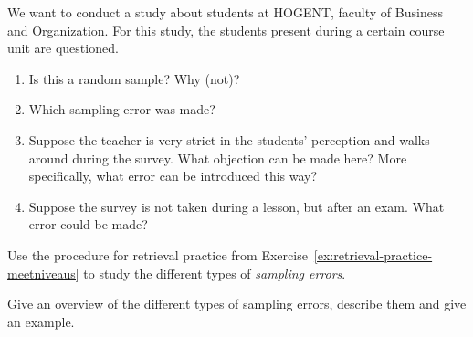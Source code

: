   \begin{exercise}
    We want to conduct a study about students at HOGENT, faculty of Business and Organization.
    For this study, the students present during a certain course unit are questioned.
    
    \begin{enumerate}[label=\alph*.]
      \item Is this a random sample? Why (not)?
      \item Which sampling error was made?
      \item Suppose the teacher is very strict in the students' perception and walks around during the survey. What objection can be made here? More specifically, what error can be introduced this way?
      \item Suppose the survey is not taken during a lesson, but after an exam. What error could be made?
    \end{enumerate}
  \end{exercise}
  
  \begin{exercise}
    Use the procedure for retrieval practice from Exercise~\ref{ex:retrieval-practice-meetniveaus} to study the different types of \emph{sampling errors}.
    
    Give an overview of the different types of sampling errors, describe them and give an example.
  \end{exercise}

